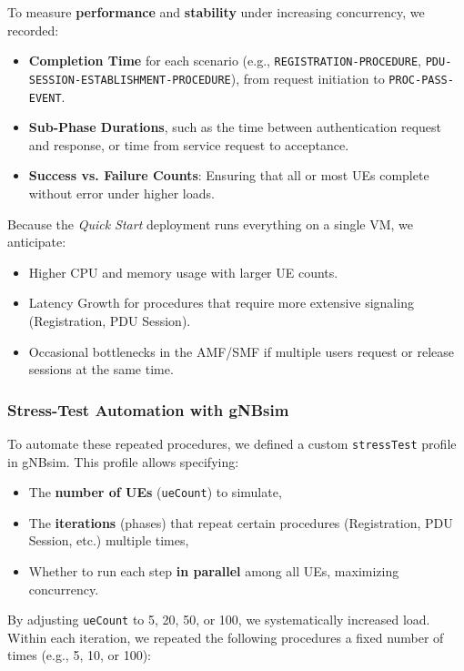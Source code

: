 To measure \textbf{performance} and \textbf{stability} under increasing concurrency, we recorded:

\begin{itemize}
    \item \textbf{Completion Time} for each scenario (e.g., \texttt{REGISTRATION\allowbreak-PROCEDURE}, \texttt{PDU\allowbreak-SESSION\allowbreak-ESTABLISHMENT\allowbreak-PROCEDURE}), from request initiation to \texttt{PROC\allowbreak-PASS\allowbreak-EVENT}.
    \item \textbf{Sub-Phase Durations}, such as the time between authentication request and response, or time from service request to acceptance.
    \item \textbf{Success vs. Failure Counts}: Ensuring that all or most UEs complete without error under higher loads.
\end{itemize}


Because the \textit{Quick Start} deployment runs everything on a single VM, we anticipate:
\begin{itemize}
    \item Higher CPU and memory usage with larger UE counts.
    \item Latency Growth for procedures that require more extensive signaling (Registration, PDU Session).
    \item Occasional bottlenecks in the AMF/SMF if multiple users request or release sessions at the same time.
\end{itemize}

\subsubsection{Stress-Test Automation with gNBsim}
\label{subsec:stress-profile-gnbsim}

To automate these repeated procedures, we defined a custom \texttt{stressTest} profile in gNBsim. This profile allows specifying:
\begin{itemize}
    \item The \textbf{number of UEs} (\texttt{ueCount}) to simulate,
    \item The \textbf{iterations} (phases) that repeat certain procedures (Registration, PDU Session, etc.) multiple times,
    \item Whether to run each step \textbf{in parallel} among all UEs, maximizing concurrency.
\end{itemize}

By adjusting \texttt{ueCount} to 5, 20, 50, or 100, we systematically increased load.  
Within each iteration, we repeated the following procedures a fixed number of times (e.g., 5, 10, or 100):

